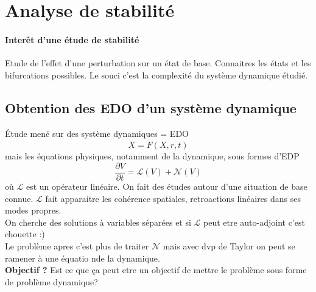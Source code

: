 \section{Analyse de stabilité}
\paragraph{Interêt d'une étude de stabilité} Etude de l'effet d'une perturbation sur un état de base. Connaitres les états et les bifurcations possibles. Le souci c'est la complexité du système dynamique étudié. \\

\subsection{Obtention des EDO d'un système dynamique}
Étude mené sur des système dynamiques = EDO
 \begin{equation}
 	\label{eq:EDOdyn}
 	\dot X = F(X, r, t) 
 \end{equation}
 mais les équations physiques, notamment de la dynamique, sous formes d'EDP 
 \begin{equation}
 	\label{eq:EDPphys}
 	\frac{\partial V}{\partial t} = \mathcal L(V) + \mathcal{N} (V)
\end{equation}
 où $\mathcal L$ est un opérateur linéaire. On fait des études autour d'une situation de base connue. $\mathcal{L}$ fait apparaitre les cohérence spatiales, retroactions linéaires dans ses modes propres. \\
 On cherche des solutions à variables séparées et si $\mathcal{L}$ peut etre auto-adjoint c'est chouette :) \\
 Le problème apres c'est plus de traiter $\mathcal{N}$ mais avec dvp de Taylor on peut se ramener à une équatio nde la dynamique. \\
 \textbf{Objectif ? } Est ce que ça peut etre un objectif de mettre le problème sous forme de problème dynamique? \\

